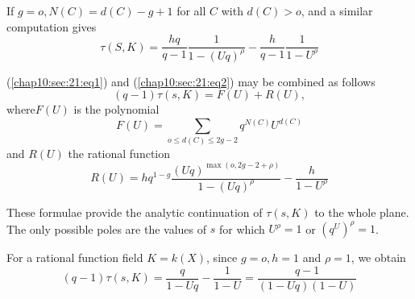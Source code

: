 If $g = o, N(C) = d (C) - g+1$ for all $C$ with $d (C) > o$, and a
similar computation gives 
\begin{equation*}
  \tau (S, K) = \frac{hq}{q-1} \frac{1}{1-(Uq)^\rho} - \frac{h}{q-1}
  \frac{1}{1-U^\rho} \tag{2}\label{chap10:sec:21:eq2}  
\end{equation*}

(\ref{chap10:sec:21:eq1}) and (\ref{chap10:sec:21:eq2}) may be combined as follows
\begin{equation*}
  (q-1) \tau (s,K) = F (U) + R (U),\tag{3}\label{chap10:sec:21:eq3} 
\end{equation*}
where\pageoriginale $F(U)$ is the polynomial 
\begin{equation*}
  F (U) = \sum_{o \le d (C) \le 2g -2} q^{N (C)} U^{d (C)} \tag{4}\label{chap10:sec:21:eq4} 
\end{equation*}
and $R (U)$ the rational function
\begin{equation*}
  R(U) = hq^{1-g} \frac{(U q)^{\max (o,2g-2+\rho)}}{1-(Uq)^\rho} -
  \frac{h}{1-U^\rho} \tag{5}\label{chap10:sec:21:eq5}  
\end{equation*}

These formulae provide the analytic continuation of $\tau (s, K)$ to
the whole plane. The only possible poles are the values of $s$ for
which $U^\rho = 1$ or $(q^U)^\rho=1$.  

For a rational function field $K = k (X)$, since $g=o, h=1$ and $\rho
= 1$, we obtain  
$$
(q-1) \tau (s, K) = \frac{q}{1-Uq} - \frac{1}{1-U} =
\frac{q-1}{(1-Uq)(1-U)} 
$$

